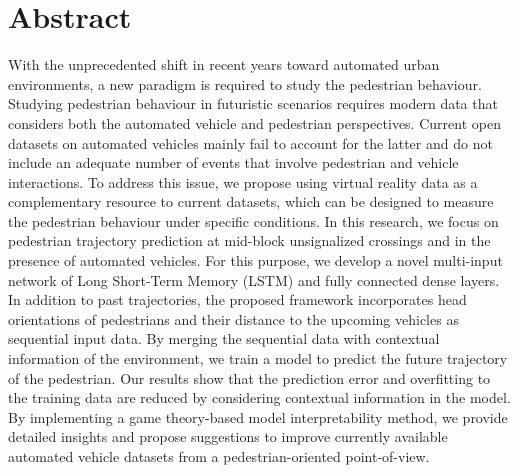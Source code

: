 \section*{Abstract}
With the unprecedented shift in recent years toward automated urban environments, a new paradigm is required to study the  pedestrian behaviour. Studying pedestrian behaviour in futuristic scenarios requires modern data that considers both the automated vehicle and pedestrian perspectives. Current open datasets on automated vehicles mainly fail to account for the latter and do not include an adequate number of events that involve pedestrian and vehicle interactions. To address this issue, we propose using virtual reality data as a complementary resource to current datasets, which can be designed to measure the pedestrian behaviour under specific conditions. In this research, we focus on pedestrian trajectory prediction at mid-block unsignalized crossings and in the presence of automated vehicles. For this purpose, we develop a novel multi-input network of Long Short-Term Memory (LSTM) and fully connected dense layers. In addition to past trajectories, the proposed framework incorporates head orientations of pedestrians and their distance to the upcoming vehicles as sequential input data. By merging the sequential data with contextual information of the environment, we train a model to predict the future trajectory of the pedestrian. Our results show that the prediction error and overfitting to the training data are reduced by considering contextual information in the model. By implementing a game theory-based model interpretability method, we provide detailed insights and propose suggestions to improve currently available automated vehicle datasets from a pedestrian-oriented point-of-view. 
\clearpage












